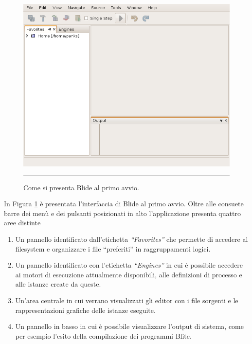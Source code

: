 \begin{figure}[t!]
\begin{center}
\includegraphics[scale=0.60]
{blide/dia/Blide1}
\caption[Blide Schermata]{Come si presenta Blide al primo avvio.}
\rule{7cm}{0.01cm}
  \label{fig:blide1}
\end{center}
\end{figure}

In Figura \ref{fig:blide1} è presentata l'interfaccia di Blide al primo avvio. 
Oltre alle consuete barre dei menù e dei pulsanti posizionati in alto
l'applicazione presenta quattro aree distinte

\begin{enumerate}
  \item Un pannello identificato dall'etichetta \emph{``Favorites''} che
  permette di accedere al filesystem e organizzare i file ``preferiti''
  in raggruppamenti logici.
  \item Un pannello identificato con l'etichetta \emph{``Engines''} in cui è
  possibile accedere ai motori di esecuzione attualmente disponibili, alle
  definizioni di processo e alle istanze create da queste.
  \item Un'area centrale in cui verrano visualizzati gli editor con i file
  sorgenti e le rappresentazioni grafiche delle istanze eseguite.
  \item Un pannello in basso in cui è possibile visualizzare l'output di
  sistema, come per esempio l'esito della compilazione dei programmi Blite.
\end{enumerate}

